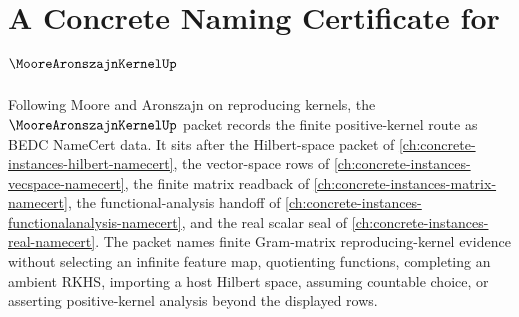 \chapter{A Concrete Naming Certificate for $\MooreAronszajnKernelUp$}
\label{ch:concrete-instances-moore-aronszajn-kernel-namecert}

Following Moore and Aronszajn on reproducing kernels, the $\MooreAronszajnKernelUp$ packet records the finite positive-kernel route as BEDC NameCert data. It sits after the Hilbert-space packet of \autoref{ch:concrete-instances-hilbert-namecert}, the vector-space rows of \autoref{ch:concrete-instances-vecspace-namecert}, the finite matrix readback of \autoref{ch:concrete-instances-matrix-namecert}, the functional-analysis handoff of \autoref{ch:concrete-instances-functionalanalysis-namecert}, and the real scalar seal of \autoref{ch:concrete-instances-real-namecert}. The packet names finite Gram-matrix reproducing-kernel evidence without selecting an infinite feature map, quotienting functions, completing an ambient RKHS, importing a host Hilbert space, assuming countable choice, or asserting positive-kernel analysis beyond the displayed rows.

